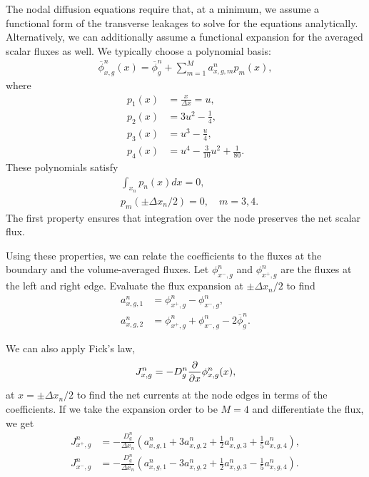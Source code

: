 The nodal diffusion equations require that, at a minimum, we assume a functional form of the transverse leakages to solve for the equations analytically. Alternatively, we can additionally assume a functional expansion for the averaged scalar fluxes as well. We typically choose a polynomial basis:
\begin{align}
  \overline{\phi}_{x,g}^n(x) = \overline{\phi}_g^n + \sum_{m=1}^M a_{x,g,m}^n p_m(x),
\end{align}
where
\begin{subequations}
\begin{align}
  p_1(x) &= \frac{ x }{ \Delta x } = u , \\
  p_2(x) &= 3 u^2 - \frac{1}{4} , \\
  p_3(x) &= u^3 - \frac{u}{4}, \\
  p_4(x) &= u^4 - \frac{3}{10} u^2 + \frac{1}{80} .
\end{align}
\end{subequations}
These polynomials satisfy
\begin{subequations}
\begin{align}
  &\int_{x_n} p_n(x) dx = 0, \\
  &p_m( \pm \Delta x_n / 2 ) = 0, \quad m = 3, 4.
\end{align}
\end{subequations}
The first property ensures that integration over the node preserves the net scalar flux.

Using these properties, we can relate the coefficients to the fluxes at the boundary and the volume-averaged fluxes. Let $\phi_{x^-,g}^n$ and $\phi_{x^+,g}^n$ are the fluxes at the left and right edge. Evaluate the flux expansion at $\pm \Delta x_n/2$ to find
\begin{subequations}
\begin{align}
  a_{x,g,1}^n &= \phi_{x^+,g}^n - \phi_{x^-,g}^n , \\
  a_{x,g,2}^n &= \phi_{x^+,g}^n + \phi_{x^-,g}^n - 2 \overline{\phi}_g^n . 
\end{align}
\end{subequations}

We can also apply Fick's law,
\begin{align}
  J_{x,g}^n = -D_g^n \frac{ \partial {} }{ \partial {x} } \phi_{x,g}^n(x) ,
\end{align}
at $x = \pm \Delta x_n /2$ to find the net currents at the node edges in terms of the coefficients. If we take the expansion order to be $M = 4$ and differentiate the flux, we get
\begin{subequations} \label{Eq:diffusion_nodalExpansionMethod_4thOrder_Currents}
\begin{align}
  J_{x^+,g}^n &= -\frac{ D_g^n }{ \Delta x_n } \left( a_{x,g,1}^n + 3 a_{x,g,2}^n + \frac{1}{2} a_{x,g,3}^n + \frac{1}{5} a_{x,g,4}^n \right) , \\
  J_{x^-,g}^n &= -\frac{ D_g^n }{ \Delta x_n } \left( a_{x,g,1}^n - 3 a_{x,g,2}^n + \frac{1}{2} a_{x,g,3}^n - \frac{1}{5} a_{x,g,4}^n \right) .
\end{align}
\end{subequations}

